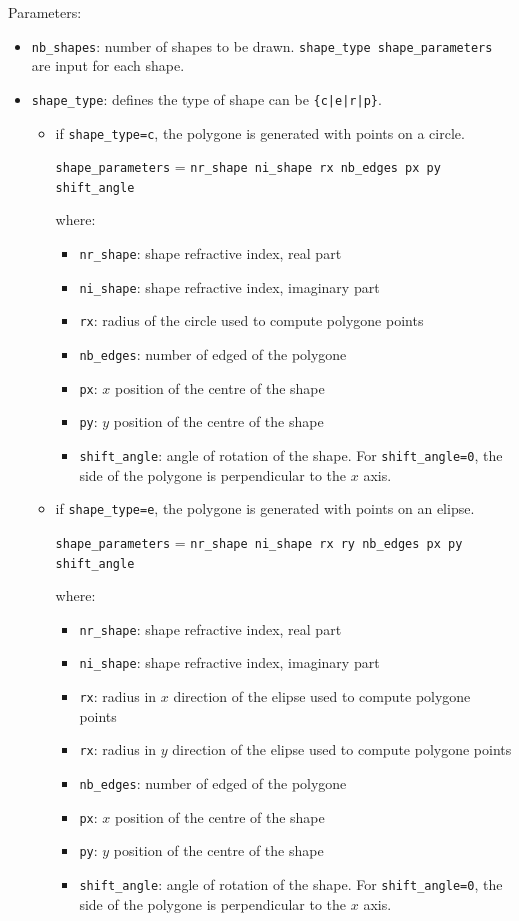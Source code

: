 Parameters:
\begin{itemize}
\item \lstinline!nb_shapes!: number of shapes to be drawn. \lstinline!shape_type shape_parameters! are input for each shape.
\item \lstinline!shape_type!: defines the type of shape can be \lstinline!{c|e|r|p}!.
    \begin{itemize}
    	\item if \lstinline!shape_type=c!, the polygone is generated with points on a circle.
        
        	\lstinline!shape_parameters! = \lstinline!nr_shape ni_shape rx nb_edges px py shift_angle!
        	
        	where:
		    \begin{itemize}
	    		\item \lstinline!nr_shape!: shape refractive index, real part
				\item \lstinline!ni_shape!: shape refractive index, imaginary part
				\item \lstinline!rx!: radius of the circle used to compute polygone points
				\item \lstinline!nb_edges!: number of edged of the polygone
				\item \lstinline!px!: $x$ position of the centre of the shape 
				\item \lstinline!py!: $y$ position of the centre of the shape
				\item \lstinline!shift_angle!: angle of rotation of the shape. For \lstinline!shift_angle=0!, the side of the polygone is perpendicular to the $x$ axis.		
	    	\end{itemize}

    	\item if \lstinline!shape_type=e!, the polygone is generated with points on an elipse.
        
        	\lstinline!shape_parameters! = \lstinline!nr_shape ni_shape rx ry nb_edges px py shift_angle!
        	
        	where:
		    \begin{itemize}
	    		\item \lstinline!nr_shape!: shape refractive index, real part
				\item \lstinline!ni_shape!: shape refractive index, imaginary part
				\item \lstinline!rx!: radius in $x$ direction of the elipse used to compute polygone points
				\item \lstinline!rx!: radius in $y$ direction of the elipse used to compute polygone points
				\item \lstinline!nb_edges!: number of edged of the polygone
				\item \lstinline!px!: $x$ position of the centre of the shape 
				\item \lstinline!py!: $y$ position of the centre of the shape
				\item \lstinline!shift_angle!: angle of rotation of the shape. For \lstinline!shift_angle=0!, the side of the polygone is perpendicular to the $x$ axis.		
	    	\end{itemize}


\end{itemize}
\end{itemize}
